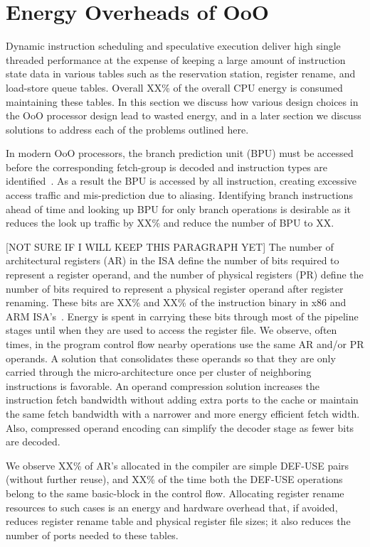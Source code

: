 \section{Energy Overheads of OoO}
\label{sec:o3_overhead}

Dynamic instruction scheduling and speculative execution deliver high single
threaded performance at the expense of keeping a large amount of instruction
state data in various tables such as the reservation station, register rename,
      and load-store queue tables. Overall XX\% of the overall CPU energy is
      consumed maintaining these tables. In this section we discuss how various
      design choices in the OoO processor design lead to wasted energy, and in a
      later section we discuss solutions to address each of the problems
      outlined here.

In modern OoO processors, the branch prediction unit (BPU) must be accessed
before the corresponding fetch-group is decoded and instruction types are
identified~\cite{ref:EV8}. As a result the BPU is accessed by all instruction,
    creating excessive access traffic and mis-prediction due to aliasing.
    Identifying branch instructions ahead of time and looking up BPU for only
    branch operations is desirable as it reduces the look up traffic by XX\% and
    reduce the number of BPU to XX.

[NOT SURE IF I WILL KEEP THIS PARAGRAPH YET]
The number of architectural registers (AR) in the ISA define the number of bits
required to represent a register operand, and the number of physical registers
(PR) define the number of bits required to represent a physical register operand
after register renaming. These bits are XX\% and XX\% of the instruction binary
in x86 and ARM ISA's~\cite{}. Energy is spent in carrying these bits through
most of the pipeline stages until when they are used to access the register
file. We observe, often times, in the program control flow nearby operations use
the same AR and/or PR operands. A solution that consolidates these operands so that
they are only carried through the micro-architecture once per cluster of
neighboring instructions is favorable. An operand compression solution 
increases the instruction fetch bandwidth without adding extra ports to the cache
or maintain the same fetch bandwidth with a narrower and more energy efficient
fetch width. Also, compressed operand encoding can simplify the decoder stage as
fewer bits are decoded. 

We observe XX\% of AR's allocated in the compiler are simple DEF-USE pairs
(without further reuse), and XX\% of the time both the DEF-USE operations belong
to the same basic-block in the control flow. Allocating register rename
resources to such cases is an energy and hardware overhead that, if avoided,
          reduces register rename table and physical register file sizes; it
          also reduces the number of ports needed to these tables. 

